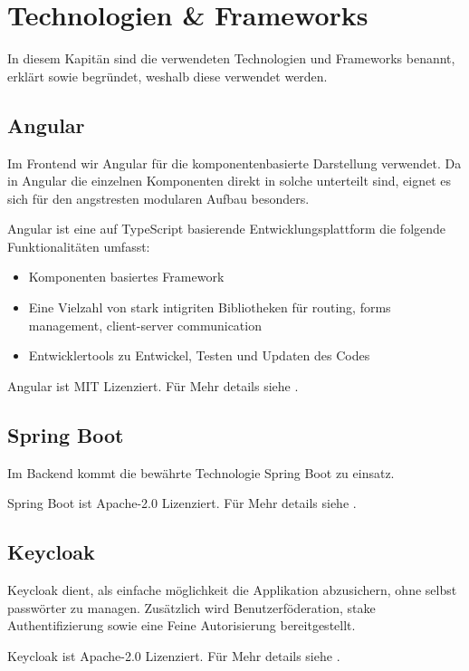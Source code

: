 \chapter{Technologien & Frameworks}

In diesem Kapitän sind die verwendeten Technologien und Frameworks benannt, erklärt
sowie begründet, weshalb diese verwendet werden.

\section{Angular}

Im Frontend wir Angular für die komponentenbasierte Darstellung verwendet.
Da in Angular die einzelnen Komponenten direkt in solche unterteilt sind,
eignet es sich für den angstresten modularen Aufbau besonders.

Angular ist eine auf \gls{TypeScript} basierende Entwicklungsplattform die folgende Funktionalitäten umfasst:
\begin{itemize}
    \item Komponenten basiertes Framework
    \item Eine Vielzahl von stark intigriten Bibliotheken für routing, forms management, client-server communication
    \item Entwicklertools zu Entwickel, Testen und Updaten des Codes
\end{itemize}
\cite{about-angular}

Angular ist MIT Lizenziert.
Für Mehr details siehe .

\section{Spring Boot}

Im Backend kommt die bewährte Technologie Spring Boot zu einsatz.

Spring Boot ist Apache-2.0 Lizenziert.
Für Mehr details siehe .

\section{Keycloak}

Keycloak dient, als einfache möglichkeit die Applikation abzusichern, ohne selbst passwörter zu managen.
Zusätzlich wird Benutzerföderation, stake Authentifizierung sowie eine Feine Autorisierung bereitgestellt.
\cite{about-keycloak}

Keycloak ist Apache-2.0 Lizenziert.
Für Mehr details siehe .

